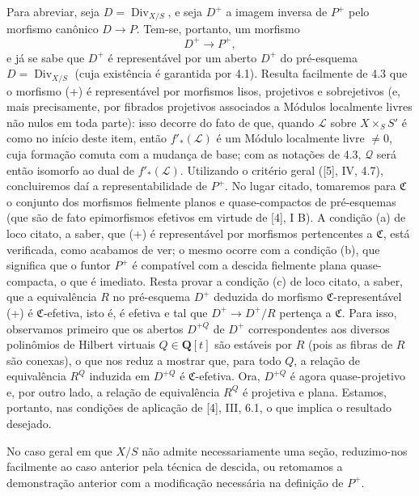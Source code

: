 Para abreviar, seja $D=\operatorname{Div}_{X/S}$, e seja $D^+$ a imagem inversa
de $P^+$ pelo morfismo canônico $D\longrightarrow P$. Tem-se, portanto, um
morfismo
\begin{equation}
D^+\longrightarrow P^+,
\tag{+}
\end{equation}
e já se sabe que $D^+$ é representável por um aberto $D^+$ do pré-esquema
$D=\operatorname{Div}_{X/S}$ (cuja existência é garantida por 4.1). Resulta
facilmente de 4.3 que o morfismo (+) é representável por morfismos lisos,
projetivos e sobrejetivos (e, mais precisamente, por fibrados projetivos
associados a Módulos localmente livres não nulos em toda parte): isso decorre
do fato de que, quando $\mathcal L$ sobre $X\times_SS'$ é como no início deste
item, então $f'_*(\mathcal L)$ é um Módulo localmente livre $\neq0$, cuja
formação comuta com a mudança de base; com as notações de 4.3, $\mathcal Q$
será então isomorfo ao dual de $f'_*(\mathcal L)$. Utilizando o critério geral
([5], IV, 4.7), concluiremos daí a representabilidade de $P^+$. No lugar citado,
tomaremos para $\mathfrak C$ o conjunto dos morfismos fielmente
planos e quase-compactos de pré-esquemas (que são de fato epimorfismos
efetivos em virtude de [4], I B). A condição (a) de loco citato, a saber, que
(+) é representável por morfismos pertencentes a $\mathfrak C$, está verificada,
como acabamos de ver; o mesmo ocorre com a condição (b), que significa que o
funtor $P^+$ é compatível com a descida fielmente plana quase-compacta, o que
é imediato. Resta provar a condição (c) de loco citato, a saber, que a
equivalência $R$ no pré-esquema $D^+$ deduzida do morfismo
$\mathfrak C$-representável (+) é $\mathfrak C$-efetiva, isto é, é efetiva e
tal que $D^+\longrightarrow D^+/R$ pertença a $\mathfrak C$. Para isso,
observamos primeiro que os abertos $D^{+Q}$ de $D^+$ correspondentes aos
diversos polinômios de Hilbert virtuais $Q\in\mathbf Q[t]$ são estáveis por $R$
(pois as fibras de $R$ são conexas), o que nos reduz a mostrar que, para todo
$Q$, a relação de equivalência $R^Q$ induzida em $D^{+Q}$ é
$\mathfrak C$-efetiva. Ora, $D^{+Q}$ é agora quase-projetivo e, por outro lado,
a relação de equivalência $R^Q$ é projetiva e plana. Estamos, portanto, nas
condições de aplicação de [4], III, 6.1, o que implica o resultado desejado.

No caso geral em que $X/S$ não admite necessariamente uma seção, reduzimo-nos
facilmente ao caso anterior pela técnica de descida, ou retomamos a demonstração
anterior com a modificação necessária na definição de $P^+$.

